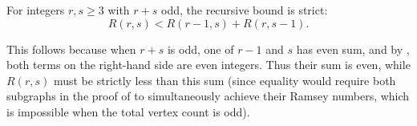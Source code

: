 \begin{corollary} \label{corollary:strict_inequality_for_diagonal_ramsey_numbers_when_r_plus_s_is_odd}
For integers $r, s \geq 3$ with $r+s$ odd, the recursive bound is strict:
$$R(r,s) < R(r-1,s) + R(r,s-1).$$

This follows because when $r+s$ is odd, one of $r-1$ and $s$ has even sum, and by , both terms on the right-hand side are even integers. Thus their sum is even, while $R(r,s)$ must be strictly less than this sum (since equality would require both subgraphs in the proof of  to simultaneously achieve their Ramsey numbers, which is impossible when the total vertex count is odd).
\end{corollary}
